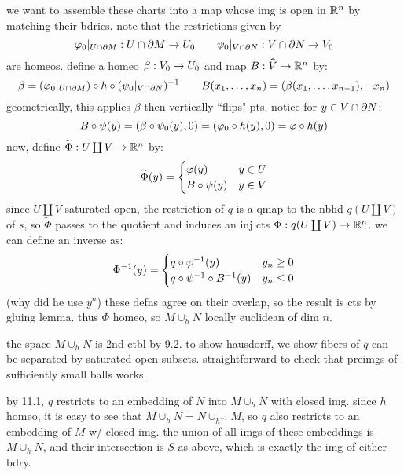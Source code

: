 \begin{pf}[source=Primary Source Material]
    we want to assemble these charts into a map whose img is open in $\mathbb{R}^{n}$ by
    matching their bdries. note that the restrictions given by
    \begin{equation*}
        \varphi_{0}\rvert_{U\cap\partial M}:U\cap\partial M \rightarrow U_{0} \qquad
        \psi_{0}\rvert_{V\cap\partial N}:V \cap\partial N \rightarrow V_{0}
    \end{equation*}
    are homeos. define a homeo $\beta:V_{0}\rightarrow U_{0}$ and map $B:\widehat{V}\rightarrow
    \mathbb{R}^{n}$ by:
    \begin{equation*}
        \beta = (\varphi_{0}\rvert_{U\cap\partial M})\circ h \circ
        (\psi_{0}\rvert_{V\cap\partial N})^{-1} \qquad
        B(x_{1},\dots,x_{n}) = (\beta(x_{1},\dots,x_{n-1}),-x_{n})
    \end{equation*}
    geometrically, this applies $\beta$ then vertically ``flips" pts. notice for
    $y\in V\cap\partial N$:
    \begin{equation*}
        B\circ\psi(y)=(\beta\circ\psi_{0}(y),0)=(\varphi_{0}\circ h(y),0)
        = \varphi \circ h(y)
    \end{equation*}
    now, define $\widetilde{\Phi}:U\coprod V\rightarrow \mathbb{R}^{n}$ by:
    \begin{equation*}
        \widetilde{\Phi}(y)=
        \begin{cases}
            \varphi(y) & y \in U \\
            B\circ\psi(y) & y \in V
        \end{cases}
    \end{equation*}
    since $U\coprod V$ saturated open, the restriction of $q$ is a qmap to the
    nbhd $q(U\coprod V)$ of $s$, so $\tilde{\Phi}$ passes to the quotient and
    induces an inj cts $\Phi:q(U\coprod V)\rightarrow\mathbb{R}^{n}$. we can define an inverse
    as:
    \begin{equation*}
        \Phi^{-1}(y)=
        \begin{cases}
            q\circ \varphi^{-1}(y) & y_{n}\geq0 \\
            q\circ\psi^{-1}\circ B^{-1}(y) & y_{n}\leq 0
        \end{cases}
    \end{equation*}
    (why did he use $y^{n}$) these defns agree on their overlap, so the result is
    cts by gluing lemma. thus $\Phi$ homeo, so $M\cup_{h}N$ locally euclidean of
    dim $n$.

    the space $M\cup_{h}N$ is 2nd ctbl by 9.2. to show hausdorff, we show fibers
    of $q$ can be separated by saturated open subsets. straightforward to check
    that preimgs of sufficiently small balls works.

    by 11.1, $q$ restricts to an embedding of $N$ into $M\cup_{h}N$ with closed
    img. since $h$ homeo, it is easy to see that $M\cup_{h}N=N\cup_{h^{-1}}M$, so
    $q$ also restricts to an embedding of $M$ w/ closed img. the union of all
    imgs of these embeddings is $M\cup_{h}N$, and their intersection is $S$ as
    above, which is exactly the img of either bdry.
\end{pf} \

